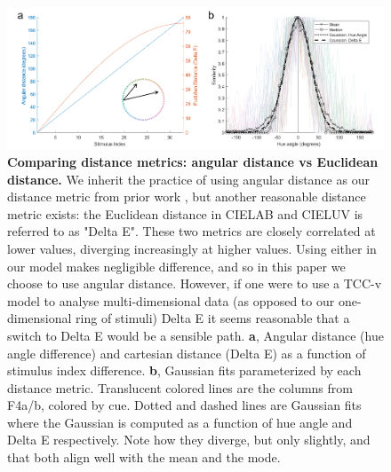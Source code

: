 \documentclass[9pt,biorxiv,lineno,onehalfspacing]{lapreprint}
\begin{document}
\begin{figure}
    \centering
    \begin{fullwidth}
    \includegraphics[width=\textwidth+4cm]{Outputs/Paper/Figures/flat/SI7_distanceMetricComparison.png}
    \caption{\textbf{Comparing distance metrics: angular distance vs Euclidean distance.}
    We inherit the practice of using angular distance as our distance metric from prior work \citep{bae_why_2015,panichello_error-correcting_2019}, but another reasonable distance metric exists: the Euclidean distance in CIELAB and CIELUV is referred to as "Delta E". 
	These two metrics are closely correlated at lower values, diverging increasingly at higher values. 
	Using either in our model makes negligible difference, and so in this paper we choose to use angular distance. 
	However, if one were to use a TCC-v model to analyse multi-dimensional data (as opposed to our one-dimensional ring of stimuli) Delta E it seems reasonable that a switch to Delta E would be a sensible path.
	\textbf{a}, Angular distance (hue angle difference) and cartesian distance (Delta E) as a function of stimulus index difference. 
	\textbf{b}, Gaussian fits parameterized by each distance metric. 
	Translucent colored lines are the columns from F4a/b, colored by cue. 
	Dotted and dashed lines are Gaussian fits where the Gaussian is computed as a function of hue angle and Delta E respectively. 
	Note how they diverge, but only slightly, and that both align well with the mean and the mode.
    } 
    \label{fig:distanceMetricComparison}
    \end{fullwidth}
\end{figure}








\end{document}
